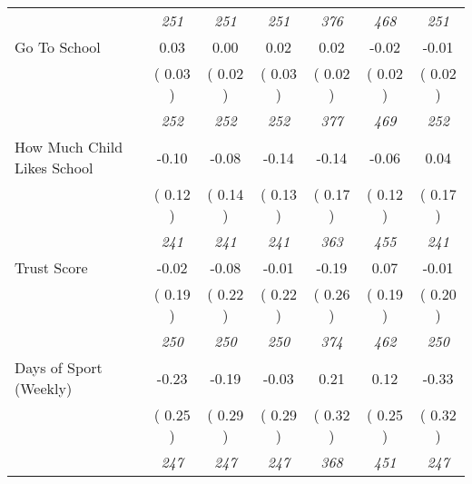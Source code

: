 \begin{tabular}{l c c c c c c}
& \textit{ 251 } & \textit{ 251 } & \textit{ 251 } & \textit{ 376 } & \textit{ 468 } & \textit{ 251 } \\
Go To School &      0.03 &      0.00 &      0.02 &      0.02 &     -0.02 &     -0.01 \\
& (     0.03 ) & (     0.02 ) & (     0.03 ) & (     0.02 ) & (     0.02 ) & (     0.02 ) \\
& \textit{ 252 } & \textit{ 252 } & \textit{ 252 } & \textit{ 377 } & \textit{ 469 } & \textit{ 252 } \\
How Much Child Likes School &     -0.10 &     -0.08 &     -0.14 &     -0.14 &     -0.06 &      0.04 \\
& (     0.12 ) & (     0.14 ) & (     0.13 ) & (     0.17 ) & (     0.12 ) & (     0.17 ) \\
& \textit{ 241 } & \textit{ 241 } & \textit{ 241 } & \textit{ 363 } & \textit{ 455 } & \textit{ 241 } \\
Trust Score &     -0.02 &     -0.08 &     -0.01 &     -0.19 &      0.07 &     -0.01 \\
& (     0.19 ) & (     0.22 ) & (     0.22 ) & (     0.26 ) & (     0.19 ) & (     0.20 ) \\
& \textit{ 250 } & \textit{ 250 } & \textit{ 250 } & \textit{ 374 } & \textit{ 462 } & \textit{ 250 } \\
Days of Sport (Weekly) &     -0.23 &     -0.19 &     -0.03 &      0.21 &      0.12 &     -0.33 \\
& (     0.25 ) & (     0.29 ) & (     0.29 ) & (     0.32 ) & (     0.25 ) & (     0.32 ) \\
& \textit{ 247 } & \textit{ 247 } & \textit{ 247 } & \textit{ 368 } & \textit{ 451 } & \textit{ 247 } \\
\bottomrule
\end{tabular}
